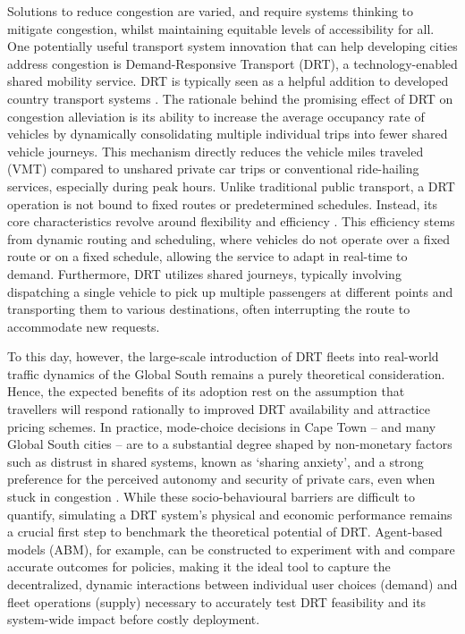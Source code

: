 \documentclass[main.tex]{subfiles}
\begin{document}
Solutions to reduce congestion are varied, and require systems thinking to mitigate congestion, whilst maintaining equitable levels of accessibility for all. One potentially useful transport system innovation that can help developing cities address congestion is Demand-Responsive Transport (DRT), a technology-enabled shared mobility service. DRT is typically seen as a helpful addition to developed country transport systems \citep{Ben-dor, engelhardt2019quantifying, schluter2021impact, Kaddoura.2020,maggi2021price, miskolczi2021urban, zwick2021ride, article}. The rationale behind the promising effect of DRT on congestion alleviation is its ability to increase the average occupancy rate of vehicles by dynamically consolidating multiple individual trips into fewer shared vehicle journeys. This mechanism directly reduces the vehicle miles traveled (VMT) compared to unshared private car trips or conventional ride-hailing services, especially during peak hours. Unlike traditional public transport, a DRT operation is not bound to fixed routes or predetermined schedules. Instead, its core characteristics revolve around flexibility and efficiency \citep{ronald2015simulating}. This efficiency stems from dynamic routing and scheduling, where vehicles do not operate over a fixed route or on a fixed schedule, allowing the service to adapt in real-time to demand. Furthermore, DRT utilizes shared journeys, typically involving dispatching a single vehicle to pick up multiple passengers at different points and transporting them to various destinations, often interrupting the route to accommodate new requests. 

To this day, however, the large-scale introduction of DRT fleets into real-world traffic dynamics of the Global South remains a purely theoretical consideration. Hence, the expected benefits of its adoption rest on the assumption that travellers will respond rationally to improved DRT availability and attractice pricing schemes. In practice, mode-choice decisions in Cape Town – and many Global South cities – are to a substantial degree shaped by non-monetary factors such as distrust in shared systems, known as ‘sharing anxiety’, and a strong preference for the perceived autonomy and security of private cars, even when stuck in congestion \citep{Dolins2021, Lavieri.2019}. While these socio-behavioural barriers are difficult to quantify, simulating a DRT system’s physical and economic performance remains a crucial first step to benchmark the theoretical potential of DRT. Agent-based models (ABM), for example, can be constructed to experiment with and compare accurate outcomes for policies, making it the ideal tool to capture the decentralized, dynamic interactions between individual user choices (demand) and fleet operations (supply) necessary to accurately test DRT feasibility and its system-wide impact before costly deployment. 
\end{document}
